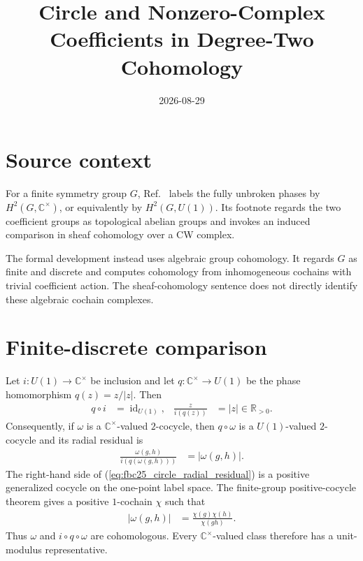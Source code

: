 \documentclass{article}
\title{Circle and Nonzero-Complex Coefficients in Degree-Two Cohomology}
\author{}
\date{2026-08-29}
\begin{document}
\maketitle
{}

\section{Source context}

For a finite symmetry group $G$, Ref.~\cite[lines~1927--1931]{FrancoRubio2025MPUGauging}
labels the fully unbroken phases by $H^2(G,\mathbb C^\times)$, or equivalently
by $H^2(G,U(1))$.  Its footnote regards the two coefficient groups as
topological abelian groups and invokes an induced comparison in sheaf
cohomology over a CW complex.

The formal development instead uses algebraic group cohomology.  It regards
$G$ as finite and discrete and computes cohomology from inhomogeneous cochains
with trivial coefficient action.  The sheaf-cohomology sentence does not
directly identify these algebraic cochain complexes.

\section{Finite-discrete comparison}

Let $i:U(1)\longrightarrow\mathbb C^\times$ be inclusion and let
$q:\mathbb C^\times\longrightarrow U(1)$ be the phase homomorphism
$q(z)=z/|z|$.  Then
\begin{align}
    q\circ i
     & =\operatorname{id}_{U(1)},
     &
    \frac{z}{i(q(z))}
     & =|z|\in\mathbb R_{>0}.
    \label{eq:fbc25_circle_polar_retraction}
\end{align}
Consequently, if $\omega$ is a $\mathbb C^\times$-valued $2$-cocycle, then
$q\circ\omega$ is a $U(1)$-valued $2$-cocycle and its radial residual is
\begin{align}
    \frac{\omega(g,h)}{i(q(\omega(g,h)))}
     & =|\omega(g,h)|.
    \label{eq:fbc25_circle_radial_residual}
\end{align}
The right-hand side of
(\ref{eq:fbc25_circle_radial_residual}) is a positive generalized cocycle on
the one-point label space.  The finite-group positive-cocycle theorem gives a
positive $1$-cochain $\chi$ such that
\begin{align}
    |\omega(g,h)|
     & =\frac{\chi(g)\chi(h)}{\chi(gh)}.
    \label{eq:fbc25_circle_positive_coboundary}
\end{align}
Thus $\omega$ and $i\circ q\circ\omega$ are cohomologous.  Every
$\mathbb C^\times$-valued class therefore has a unit-modulus representative.
\end{document}
